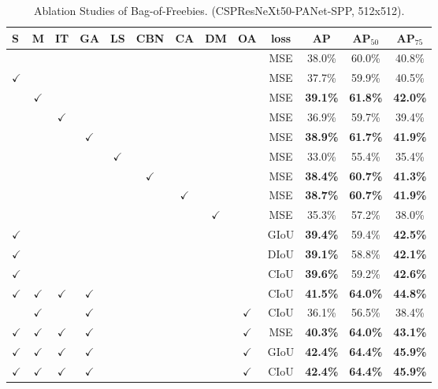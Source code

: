 \documentclass[10pt,twocolumn,letterpaper]{article}
\begin{document}
\begin{table*}[h]
	\centering
	\begin{threeparttable}[h]
		\footnotesize
		\caption{Ablation Studies of Bag-of-Freebies. (CSPResNeXt50-PANet-SPP, 512x512).}
		\label{table:bof}
		\begin{tabular}{lcccccccccccc}
			\toprule
			\textbf{S} & \textbf{M} & \textbf{IT} & \textbf{GA} & \textbf{LS} & \textbf{CBN} & \textbf{CA} & \textbf{DM} & \textbf{OA} & \textbf{loss} & \textbf{AP} & \textbf{AP$_{50}$} & \textbf{AP$_{75}$} \\	
			\midrule
			&  &  &  &  &  &  &  &  & MSE & 38.0\% & 60.0\% & 40.8\% \\
			$\checkmark$ &  &  &  &  &  &  &  &  & MSE & 37.7\% & 59.9\% & 40.5\% \\
			& $\checkmark$ &  &  &  &  &  &  &  & MSE & \textbf{39.1\%} & \textbf{61.8\%} & \textbf{42.0\%} \\
			&  & $\checkmark$ &  &  &  &  &  &  & MSE & 36.9\% & 59.7\% & 39.4\% \\
			&  &  & $\checkmark$ &  &  &  &  &  & MSE & \textbf{38.9\%} & \textbf{61.7\%} & \textbf{41.9\%} \\
			&  &  &  & $\checkmark$ &  &  &  &  & MSE & 33.0\% & 55.4\% & 35.4\% \\
			&  &  &  &  & $\checkmark$ &  &  &  & MSE & \textbf{38.4\%} & \textbf{60.7\%} & \textbf{41.3\%} \\
			&  &  &  &  &  & $\checkmark$ &  &  & MSE & \textbf{38.7\%} & \textbf{60.7\%} & \textbf{41.9\%} \\
			&  &  &  &  &  &  & $\checkmark$ &  & MSE & 35.3\% & 57.2\% & 38.0\% \\
			$\checkmark$ &  &  &  &  &  &  &  &  & GIoU & \textbf{39.4\%} & 59.4\% & \textbf{42.5\%} \\
			$\checkmark$ &  &  &  &  &  &  &  &  & DIoU & \textbf{39.1\%} & 58.8\% & \textbf{42.1\%} \\
			$\checkmark$ &  &  &  &  &  &  &  &  & CIoU & \textbf{39.6\% }& 59.2\% & \textbf{42.6\%} \\
			$\checkmark$ & $\checkmark$ & $\checkmark$ & $\checkmark$ &  &  &  &  &  & CIoU & \textbf{41.5\%} & \textbf{64.0\%} & \textbf{44.8\%} \\
			& $\checkmark$ &  & $\checkmark$ &  &  &  &  & $\checkmark$ & CIoU & 36.1\% & 56.5\% & 38.4\% \\
			$\checkmark$ & $\checkmark$ & $\checkmark$ & $\checkmark$ &  &  &  &  & $\checkmark$ & MSE & \textbf{40.3\%} & \textbf{64.0\%} & \textbf{43.1\%} \\
			$\checkmark$ & $\checkmark$ & $\checkmark$ & $\checkmark$ &  &  &  &  & $\checkmark$ & GIoU & \textbf{42.4\%} & \textbf{64.4\%} & \textbf{45.9\%} \\
			$\checkmark$ & $\checkmark$ & $\checkmark$ & $\checkmark$ &  &  &  &  & $\checkmark$ & CIoU & \textbf{42.4\%} & \textbf{64.4\%} & \textbf{45.9\%} \\
			\bottomrule
		\end{tabular}
	\end{threeparttable}
\end{table*}
\end{document}
